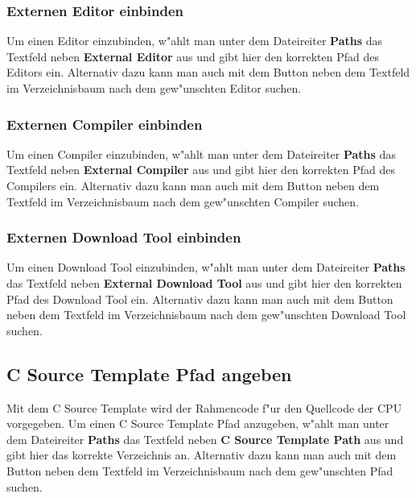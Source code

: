 \documentclass[a4paper,titlepage,12pt,ngerman]{scrbook}
\begin{document}
\subsubsection{Externen Editor einbinden}
Um einen Editor einzubinden, w"ahlt man unter dem Dateireiter {\bf Paths} das Textfeld neben {\bf External Editor} aus und gibt hier den korrekten Pfad des Editors ein. Alternativ dazu kann man auch mit dem Button neben dem Textfeld im Verzeichnisbaum nach dem gew"unschten Editor suchen.\par
\subsubsection{Externen Compiler einbinden}
Um einen Compiler einzubinden, w"ahlt man unter dem Dateireiter {\bf Paths} das Textfeld neben {\bf External Compiler} aus und gibt hier den korrekten Pfad des Compilers ein. Alternativ dazu kann man auch mit dem Button neben dem Textfeld im Verzeichnisbaum nach dem gew"unschten Compiler suchen.\par
\subsubsection{Externen Download Tool einbinden}
Um einen Download Tool einzubinden, w"ahlt man unter dem Dateireiter {\bf Paths} das Textfeld neben {\bf External Download Tool} aus und gibt hier den korrekten Pfad des Download Tool ein. Alternativ dazu kann man auch mit dem Button neben dem Textfeld im Verzeichnisbaum nach dem gew"unschten Download Tool suchen. \par
\newpage

\subsection{C Source Template Pfad angeben}
Mit dem C Source Template wird der Rahmencode f"ur den Quellcode der CPU vorgegeben.
Um einen C Source Template Pfad anzugeben, w"ahlt man unter dem Dateireiter {\bf Paths} das Textfeld neben {\bf C Source Template Path} aus und gibt hier das korrekte Verzeichnis an. Alternativ dazu kann man auch mit dem Button neben dem Textfeld im Verzeichnisbaum nach dem gew"unschten Pfad suchen. \par


\end{document}
